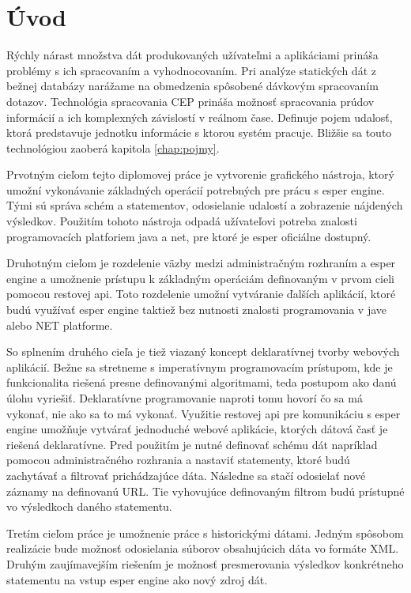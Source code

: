 \chapter*{Úvod}

Rýchly nárast množstva dát produkovaných užívateľmi a aplikáciami prináša problémy s ich spracovaním a vyhodnocovaním. Pri analýze statických dát z bežnej databázy narážame na obmedzenia spôsobené dávkovým spracovaním dotazov. Technológia spracovania \ac{CEP} prináša možnosť spracovania prúdov informácií a ich komplexných závislostí v reálnom čase. Definuje pojem udalosť, ktorá predstavuje jednotku informácie s ktorou systém pracuje. Bližšie sa touto technológiou zaoberá kapitola \ref{chap:pojmy}.

Prvotným cieľom tejto diplomovej práce je vytvorenie grafického nástroja, ktorý umožní vykonávanie základných operácií potrebných pre prácu s esper engine. Tými sú správa schém a statementov, odosielanie udalostí a zobrazenie nájdených výsledkov. Použitím tohoto nástroja odpadá užívateľovi potreba znalosti programovacích platforiem java a net, pre ktoré je esper oficiálne dostupný.

Druhotným cieľom je rozdelenie väzby medzi administračným rozhraním a esper engine a umožnenie prístupu k základným operáciám definovaným v prvom cieli pomocou restovej api. Toto rozdelenie umožní vytváranie ďalších aplikácií, ktoré budú využívať esper engine taktiež bez nutnosti znalosti programovania v jave alebo NET platforme.

So splnením druhého cieľa je tiež viazaný koncept deklaratívnej tvorby webových aplikácií. Bežne sa stretneme s imperatívnym programovacím prístupom, kde je funkcionalita riešená presne definovanými algoritmami, teda postupom ako danú úlohu vyriešiť. Deklaratívne programovanie naproti tomu hovorí čo sa má vykonať, nie ako sa to má vykonať.
Využitie restovej api pre komunikáciu s esper engine umožňuje vytvárať jednoduché webové aplikácie, ktorých dátová časť je riešená deklaratívne. Pred použitím je nutné definovať schému dát napríklad pomocou administračného rozhrania a nastaviť statementy, ktoré budú zachytávať a filtrovať prichádzajúce dáta. Následne sa stačí odosielať nové záznamy na definovanú URL. Tie vyhovujúce definovaným filtrom budú prístupné vo výsledkoch daného statementu.

Tretím cieľom práce je umožnenie práce s historickými dátami. Jedným spôsobom realizácie bude možnosť odosielania súborov obsahujúcich dáta vo formáte XML. Druhým zaujímavejším riešením je možnosť presmerovania výsledkov konkrétneho statementu na vstup esper engine ako nový zdroj dát.

